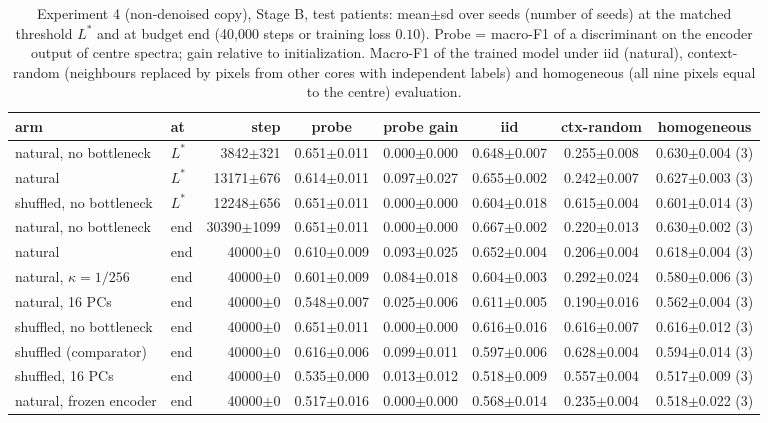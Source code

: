 \begin{table}[htbp]\centering\scriptsize
\caption{Experiment 4 (non-denoised copy), Stage B, test patients: mean$\pm$sd over seeds (number of seeds) at the matched threshold $L^\ast$ and at budget end (40{,}000 steps or training loss $0.10$). Probe = macro-F1 of a discriminant on the encoder output of centre spectra; gain relative to initialization. Macro-F1 of the trained model under iid (natural), context-random (neighbours replaced by pixels from other cores with independent labels) and homogeneous (all nine pixels equal to the centre) evaluation.}\label{tab:exp4_test_nodenoise}
\begin{tabular}{llrccccc}\toprule
arm & at & step & probe & probe gain & iid & ctx-random & homogeneous \\ \midrule
natural, no bottleneck & $L^\ast$ & 3842$\pm$321 & 0.651$\pm$0.011 & 0.000$\pm$0.000 & 0.648$\pm$0.007 & 0.255$\pm$0.008 & 0.630$\pm$0.004 (3) \\
natural & $L^\ast$ & 13171$\pm$676 & 0.614$\pm$0.011 & 0.097$\pm$0.027 & 0.655$\pm$0.002 & 0.242$\pm$0.007 & 0.627$\pm$0.003 (3) \\
shuffled, no bottleneck & $L^\ast$ & 12248$\pm$656 & 0.651$\pm$0.011 & 0.000$\pm$0.000 & 0.604$\pm$0.018 & 0.615$\pm$0.004 & 0.601$\pm$0.014 (3) \\
\midrule
natural, no bottleneck & end & 30390$\pm$1099 & 0.651$\pm$0.011 & 0.000$\pm$0.000 & 0.667$\pm$0.002 & 0.220$\pm$0.013 & 0.630$\pm$0.002 (3) \\
natural & end & 40000$\pm$0 & 0.610$\pm$0.009 & 0.093$\pm$0.025 & 0.652$\pm$0.004 & 0.206$\pm$0.004 & 0.618$\pm$0.004 (3) \\
natural, $\kappa=1/256$ & end & 40000$\pm$0 & 0.601$\pm$0.009 & 0.084$\pm$0.018 & 0.604$\pm$0.003 & 0.292$\pm$0.024 & 0.580$\pm$0.006 (3) \\
natural, 16 PCs & end & 40000$\pm$0 & 0.548$\pm$0.007 & 0.025$\pm$0.006 & 0.611$\pm$0.005 & 0.190$\pm$0.016 & 0.562$\pm$0.004 (3) \\
shuffled, no bottleneck & end & 40000$\pm$0 & 0.651$\pm$0.011 & 0.000$\pm$0.000 & 0.616$\pm$0.016 & 0.616$\pm$0.007 & 0.616$\pm$0.012 (3) \\
shuffled (comparator) & end & 40000$\pm$0 & 0.616$\pm$0.006 & 0.099$\pm$0.011 & 0.597$\pm$0.006 & 0.628$\pm$0.004 & 0.594$\pm$0.014 (3) \\
shuffled, 16 PCs & end & 40000$\pm$0 & 0.535$\pm$0.000 & 0.013$\pm$0.012 & 0.518$\pm$0.009 & 0.557$\pm$0.004 & 0.517$\pm$0.009 (3) \\
natural, frozen encoder & end & 40000$\pm$0 & 0.517$\pm$0.016 & 0.000$\pm$0.000 & 0.568$\pm$0.014 & 0.235$\pm$0.004 & 0.518$\pm$0.022 (3) \\
\bottomrule
\end{tabular}\end{table}
